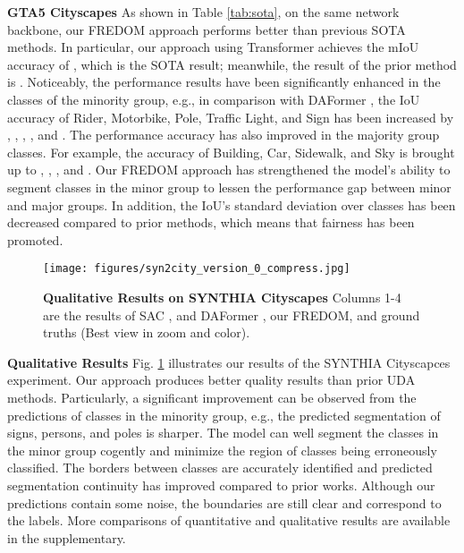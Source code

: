 \documentclass[10pt,twocolumn,letterpaper]{article}
\begin{document}
\noindent \textbf{GTA5  Cityscapes}
As shown in Table \ref{tab:sota}, on the same network backbone, our FREDOM approach performs better than previous SOTA methods. In particular, our approach using Transformer achieves the mIoU accuracy of , which is the SOTA result; meanwhile, the result of the prior method \cite{daformer} is . Noticeably, the performance results have been significantly enhanced in the classes of the minority group, e.g., in comparison with DAFormer \cite{daformer}, the IoU accuracy of Rider, Motorbike, Pole, Traffic Light, and Sign has been increased by , , , , and . The performance accuracy has also improved in the majority group classes. For example, the accuracy of Building, Car, Sidewalk, and Sky is brought up to , , , and . Our FREDOM approach has strengthened the model's ability to segment classes in the minor group to lessen the performance gap between minor and major groups. In addition, the IoU's standard deviation over classes has been decreased compared to prior methods, which means that fairness has been promoted. 

\begin{figure}[!b]
    \centering
    \vspace{-6mm}
    \texttt{[image: figures/syn2city\_version\_0\_compress.jpg]}
    \vspace{-3mm}
    \caption{\textbf{Qualitative Results on SYNTHIA  Cityscapes}
    Columns 1-4 are the results of 
    SAC \cite{Araslanov:2021:DASAC}, and DAFormer \cite{daformer}, our FREDOM, and ground truths (Best view in  zoom and color).
    }
    \label{fig:syn2city_result}
\end{figure}

\noindent \textbf{Qualitative Results}
Fig. \ref{fig:syn2city_result} illustrates our results of the SYNTHIA  Cityscapces experiment. Our approach produces better quality results than prior UDA methods. Particularly, a significant improvement can be observed from the predictions of classes in the minority group, e.g., the predicted segmentation of signs, persons, and poles is sharper. The model can well segment the classes in the minor group cogently and minimize the region of classes being erroneously classified. The borders between classes are accurately identified and predicted segmentation continuity has improved compared to prior works. Although our predictions contain some noise, the boundaries are still clear and correspond to the labels.
More comparisons of quantitative and qualitative results are available in the supplementary.
\end{document}
